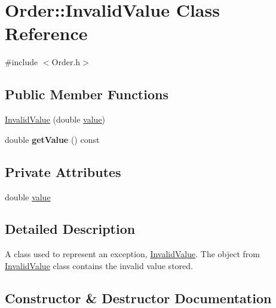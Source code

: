 \hypertarget{class_order_1_1_invalid_value}{}\section{Order\+:\+:Invalid\+Value Class Reference}
\label{class_order_1_1_invalid_value}


{\ttfamily \#include $<$Order.\+h$>$}

\subsection*{Public Member Functions}
\begin{DoxyCompactItemize}
\item 
\hyperlink{class_order_1_1_invalid_value_ab53ffc26a22a982511ec21973dd1bb33}{Invalid\+Value} (double \hyperlink{class_order_1_1_invalid_value_a6150353c94bbfcb14cf6b3cf0988a558}{value})
\item 
\mbox{\label{class_order_1_1_invalid_value_ace0e354a52acbe82fa55aa460935a291}} 
double {\bfseries get\+Value} () const
\end{DoxyCompactItemize}
\subsection*{Private Attributes}
\begin{DoxyCompactItemize}
\item 
double \hyperlink{class_order_1_1_invalid_value_a6150353c94bbfcb14cf6b3cf0988a558}{value}
\end{DoxyCompactItemize}


\subsection{Detailed Description}
A class used to represent an exception, \hyperlink{class_order_1_1_invalid_value}{Invalid\+Value}. The object from \hyperlink{class_order_1_1_invalid_value}{Invalid\+Value} class contains the invalid value stored. 

\subsection{Constructor \& Destructor Documentation}
\mbox{\label{class_order_1_1_invalid_value_ab53ffc26a22a982511ec21973dd1bb33}} 
